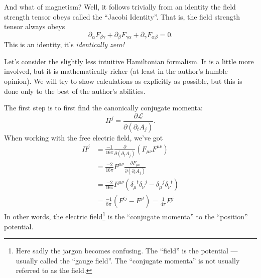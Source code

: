 And what of magnetism? Well, it follows trivially from an
identity the field strength tensor obeys called the ``Jacobi
Identity''. That is, the field strength tensor always obeys
\begin{equation}%
\partial_{\alpha}F_{\beta\gamma}+
\partial_{\beta}F_{\gamma\alpha}+
\partial_{\gamma}F_{\alpha\beta}=0.
\end{equation}
This is an identity, it's \emph{identically zero!}

 Let's consider the
slightly less intuitive Hamiltonian formalism. It is a little
more involved, but it is mathematically richer (at least in the
author's humble opinion). We will try to show calculations as
explicitly as possible, but this is done only to the best of the
author's abilities.

The first step is to first find the canonically conjugate momenta:
\begin{equation}%
\Pi^{j} = \frac{\partial\mathcal{L}}{\partial(\partial_{t}A_{j})}.
\end{equation}
When working with the free electric field, we've got
\begin{subequations}
\begin{align}
\Pi^{j} &=\frac{-1}{16\pi} \frac{\partial}{\partial(\partial_{t}A_{j})}\left(F_{\mu\nu}F^{\mu\nu}\right)\\
&= \frac{-2}{16\pi}F^{\mu\nu}\frac{\partial F_{\mu\nu}}{\partial(\partial_{t}A_{j})}\\
&=
\frac{-2}{16\pi}F^{\mu\nu}({\delta_{\mu}}^{t}{\delta_{\nu}}^{j} - {\delta_{\mu}}^{j}{\delta_{\nu}}^{t})\\
&= \frac{-1}{8\pi}(F^{tj}-F^{jt}) = \frac{1}{4\pi}E^{j}
\end{align}
\end{subequations}
In other words, the electric field\footnote{Here sadly the jargon
  becomes confusing. The ``field'' is the potential --- usually
  called the ``gauge field''. The ``conjugate momenta'' is not
  usually referred to as the field.} is the ``conjugate momenta'' to
the ``position'' potential.

